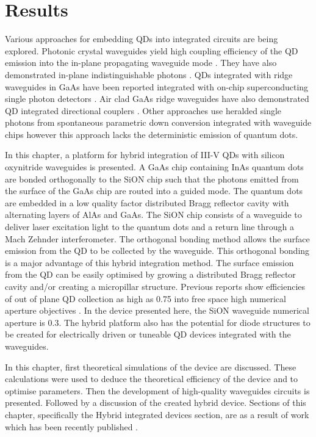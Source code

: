 
 \chapter{Results}

Various approaches for embedding QDs into integrated circuits are being
explored. Photonic crystal waveguides yield high coupling efficiency of the QD
emission into the in-plane propagating waveguide mode \cite{schwagmann2011chip}.
They have also demonstrated in-plane indistinguishable photons
\cite{kalliakos2014plane}. QDs integrated with ridge waveguides in GaAs have
been reported integrated with on-chip superconducting single photon detectors
\cite{reithmaier2013chip}. Air clad GaAs ridge waveguides have also demonstrated
QD integrated directional couplers \cite{prtljaga2014, jons2014monolithic}.
Other approaches use heralded single photons from spontaneous parametric down
conversion integrated with waveguide chips \cite{meany2014hybrid} however this
approach lacks the deterministic emission of quantum dots.

In this chapter, a platform for hybrid integration
of III-V QDs with silicon oxynitride waveguides is presented. A GaAs chip containing InAs quantum
dots are bonded orthogonally to the SiON chip such that the photons emitted
from the surface of the GaAs chip are routed into a guided mode. The quantum
dots are embedded in a low quality factor distributed Bragg reflector cavity
with alternating layers of AlAs and GaAs. The SiON chip consists of a waveguide
to deliver laser excitation light to the quantum dots and a return line through
a Mach Zehnder interferometer. The orthogonal bonding method allows the surface
emission from the QD to be collected by the waveguide. This orthogonal bonding
is a major advantage of this hybrid integration method. The surface emission
from the QD can be easily optimised by growing a distributed Bragg reflector
cavity and/or creating a micropillar structure. Previous reports show
efficiencies of out of plane QD collection as high as 0.75 into free space high
numerical aperture objectives \cite{claudon2010highly, munsch2013dielectric}.
In the device presented here, the SiON waveguide numerical aperture is 0.3. The
hybrid platform also has the potential for diode structures to be created for
electrically driven or tuneable QD devices integrated with the waveguides.

In this chapter, first theoretical simulations of the device are discussed. These calculations
were used to deduce the theoretical efficiency of the device and to optimise
parameters. Then the development of high-quality waveguides circuits is
presented. Followed by a discussion of the created hybrid device. Sections of
this chapter, specifically the Hybrid integrated devices section, are as a
result of work which has been recently published \cite{murrayEHybrid}.
